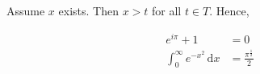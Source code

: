 \documentclass{article}
\begin{document}
Assume $x$ exists. Then $x > t$ for all $t \in T$. Hence,

\begin{equation}
\begin{aligned}
e^{i \pi} + 1 &= 0 \\
\int_0^\infty e^{-x^2} \, \mathrm{d}x &= \frac {\pi^\frac{1}{2}} {2}
\end{aligned}
\end{equation}
\end{document}
